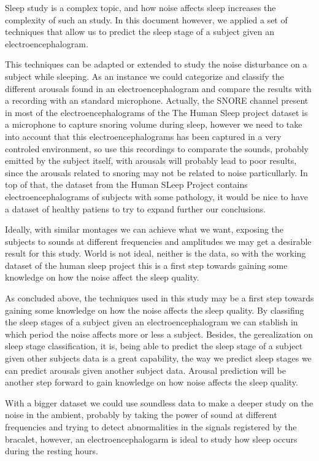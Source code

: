 

Sleep study is a complex topic, and how noise affects sleep increases the complexity of such an study. In this document however, we applied a set of techniques that allow us to predict the sleep stage of a subject given an electroencephalogram. 

This techniques can be adapted or extended to study the noise disturbance on a subject while sleeping. As an instance we could categorize and classify the different arousals found in an electroencephalogram and compare the results with a recording with an standard microphone. Actually, the SNORE channel present in most of the electroencephalograms of the The Human Sleep project dataset is a microphone to capture snoring volume during sleep, however we need to take into account that this electroencephalograms has been captured in a very controled environment, so use this recordings to comparate the sounds, probably emitted by the subject itself, with arousals will probably lead to poor results, since the arousals related to snoring may not be related to noise particullarly. In top of that, the dataset from the Human SLeep Project contains electroencephalograms of subjects with some pathology, it would be nice to have a dataset of healthy patiens to try to expand further our conclusions.

Ideally, with similar montages we can achieve what we want, exposing the subjects to sounds at different frequencies and amplitudes we may get a desirable result for this study. World is not ideal, neither is the data, so with the working dataset of the human sleep project this is a first step towards gaining some knowledge on how the noise affect the sleep quality.

As concluded above, the techniques used in this study may be a first step towards gaining some knowledge on how the noise affects the sleep quality. By classifing the sleep stages of a subject given an electroencephalogram we can stablish in which period the noise affects more or less a subject. Besides, the gerealization on sleep stage classification, it is, being able to predict the sleep stage of a subject given other subjects data is a great capability, the way we predict sleep stages we can predict arousals given another subject data. Arousal prediction will be another step forward to gain knowledge on how noise affects the sleep quality. 

With a bigger dataset we could use soundless data to make a deeper study on the noise in the ambient, probably by taking the power of sound at different frequencies and trying to detect abnormalities in the signals registered by the bracalet, however, an electroencephalogarm is ideal to study how sleep occurs during the resting hours. 

